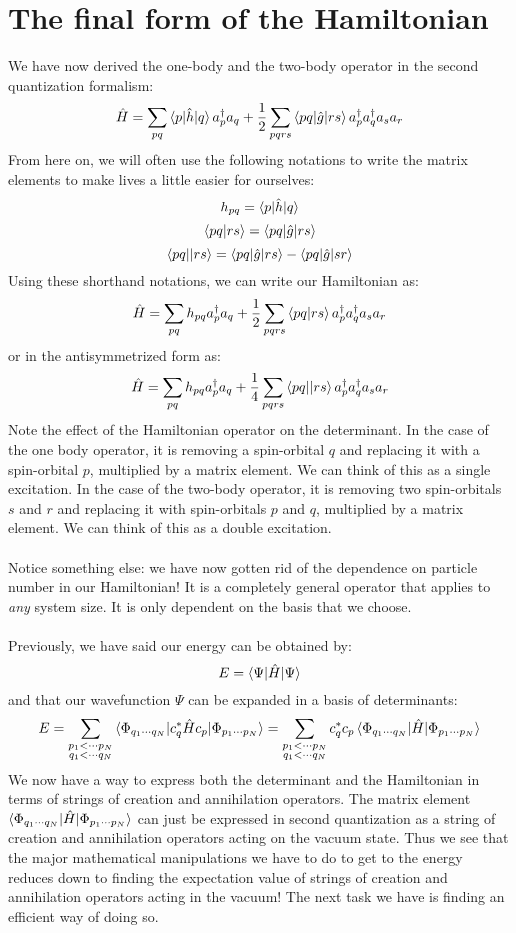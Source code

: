\documentclass{article}
\newcommand{\dg}{\ensuremath{^\dagger} }
\newcommand{\cd}{\ensuremath{\cdots} }
\begin{document}
\section{The final form of the Hamiltonian}
We have now derived the one-body and the two-body operator in the second quantization formalism: 
\begin{equation}
\hat{H} = \sum_{pq} \braket{p | \hat{h} | q}  a_p^\dagger a_q  +  \frac{1}{2}  \sum_{pqrs}  \braket{pq | \hat{g} | rs}  a\dg_{p}a\dg_{q} a_s a_r 
\end{equation}
From here on, we will often use the following notations to write the matrix elements to make lives a little easier for ourselves: 
\[ h_{pq} = \braket{p | \hat{h} | q}\]
\[ \braket{pq | rs}  = \braket{pq | \hat{g} | rs} \]
\[\braket{pq || rs}  = \braket{pq | \hat{g} | rs} - \braket{pq | \hat{g} | sr} \]
 Using these shorthand notations, we can write our Hamiltonian as: 
\[\hat{H} = \sum_{pq} h_{pq} a_p^\dagger a_q  +  \frac{1}{2}  \sum_{pqrs} \braket{pq | rs} a\dg_{p}a\dg_{q} a_s a_r  \]
or in the antisymmetrized form as: 
\[\hat{H} = \sum_{pq} h_{pq} a_p^\dagger a_q  +  \frac{1}{4}  \sum_{pqrs} \braket{pq || rs} a\dg_{p}a\dg_{q} a_s a_r  \]
Note the effect of the Hamiltonian operator on the determinant. 
In the case of the one body operator, it is removing a spin-orbital $q$ and replacing it with a spin-orbital $p$, multiplied by a matrix element. 
We can think of this as a single excitation. 
In the case of the two-body operator, it is removing two spin-orbitals $s$ and $r$ and replacing it with spin-orbitals $p$ and $q$, multiplied by a matrix element.
We can think of this as a double excitation. \\
\\
Notice something else: we have now gotten rid of the dependence on particle number in our Hamiltonian! 
It is a completely general operator that applies to \textit{any} system size. 
It is only dependent on the basis that we choose. 
\\ \\ 
Previously, we have said our energy can be obtained by: 
\[E = \braket{\Psi  | \hat{H}  | \Psi} \]
and that our wavefunction $\Psi$ can be expanded in a basis of determinants: 
\[E = \sum_{\substack{p_1 < \cd p_N \\q_1 < \cd q_N }} \braket{\Phi_{q_1 \cd q_N}  | c_q^* \hat{H}  c_p | \Phi_{p_1 \cd p_N} } = \sum_{\substack{p_1 < \cd p_N \\q_1 < \cd q_N }} c_q^* c_p \braket{\Phi_{q_1 \cd q_N}  |  \hat{H}  | \Phi_{p_1 \cd p_N} }   \]
We now have a way to express both the determinant and the Hamiltonian in terms of strings of creation and annihilation operators. 
The matrix element $\braket{\Phi_{q_1 \cd q_N}  |  \hat{H}  | \Phi_{p_1 \cd p_N} }$  can just be expressed in second quantization as a string of creation and annihilation operators acting on the vacuum state. 
 Thus we see that the major mathematical manipulations we have to do to get to the energy reduces down to finding the expectation value of strings of creation and annihilation operators acting in the vacuum!  
The next task we have is finding an efficient way of doing so. 
 
\end{document}
